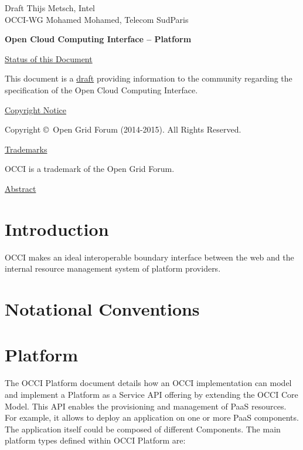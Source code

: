 \documentclass[10pt,a4paper]{article}
\begin{document}
\thispagestyle{empty}

Draft \hfill  Thijs Metsch, Intel\\
OCCI-WG \hfill  Mohamed Mohamed, Telecom SudParis\\
\rightline {\today}

\vspace*{0.5in}

\begin{Large}
\textbf{Open Cloud Computing Interface -- Platform}
\end{Large}

\vspace*{0.5in}

\underline{Status of this Document}

% 

This document is a \underline{draft} providing information to the community regarding the specification of the Open Cloud Computing Interface.

\underline{Copyright Notice}

Copyright \copyright ~Open Grid Forum (2014-2015). All Rights
Reserved.

\underline{Trademarks}

OCCI is a trademark of the Open Grid Forum.

\underline{Abstract}



\newpage
\tableofcontents
\newpage

\section{Introduction}


OCCI makes an ideal interoperable boundary interface between the web
and the internal resource management system of platform providers.

\section{Notational Conventions}



\section{Platform}

The OCCI Platform document details how an OCCI implementation can model and implement a Platform as a Service API offering by extending the OCCI Core Model. This API enables the provisioning and management of PaaS resources. For example, it allows to deploy an application on one or more PaaS components. The application itself could be composed of different Components. The main platform types defined within OCCI Platform are:
\end{document}
